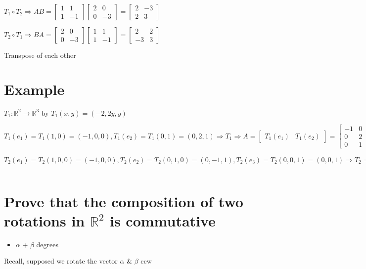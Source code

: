 \documentclass[11pt]{article}
\begin{document}
\(T_{1}\circ{}T_{2} \Rightarrow{} AB = \begin{bmatrix}1&1\\1&-1\end{bmatrix}\begin{bmatrix}2&0\\0&-3\end{bmatrix} = \begin{bmatrix}2&-3\\2&3\end{bmatrix}\)

\(T_{2}\circ{}T_{1} \Rightarrow{} BA = \begin{bmatrix}2&0\\0&-3\end{bmatrix} \begin{bmatrix}1&1\\1&-1\end{bmatrix} = \begin{bmatrix}2&2\\-3&3\end{bmatrix}\)

Transpose of each other
\section{Example}
\label{sec:org02d1f66}
\(T_{1}: \mathbb{R}^{2}\rightarrow{}\mathbb{R}^{3}\) by \(T_{1}(x,y) = (-2,2y,y)\)

\(T_{1}(e_1)=T_{1}(1,0)=(-1,0,0), T_{1}(e_{2})=T_{1}(0,1) = (0,2,1)\Rightarrow{}T_{1}\Rightarrow{}A=\begin{bmatrix}T_{1}(e_1)&T_{1}(e_{2})\end{bmatrix}=\begin{bmatrix}-1&0\\0&2\\0&1\end{bmatrix}\)
\(T_{2}(e_{1}) = T_{2}(1,0,0) = (-1,0,0), T_{2}(e_{2}) = T_{2}(0,1,0) = (0,-1,1), T_{2}(e_{3})=T_{2}(0,0,1) = (0,0,1) \Rightarrow{} T_{2} \Rightarrow{} B = \begin{bmatrix}T_{2}(e_1)&T_{2}(e_2)&T_{3}(e_3)\end{bmatrix} = \begin{bmatrix}3&0&0\\0&-1&0\\1&1&1\end{bmatrix}\)
\section{Prove that the composition of two rotations in \(\mathbb{R}^{2}\) is commutative}
\label{sec:org0d37675}
\begin{itemize}
\item \(\alpha\) + \(\beta\) degrees
\end{itemize}
Recall, supposed we rotate the vector \(\alpha\) \& \(\beta\) ccw
\end{document}
